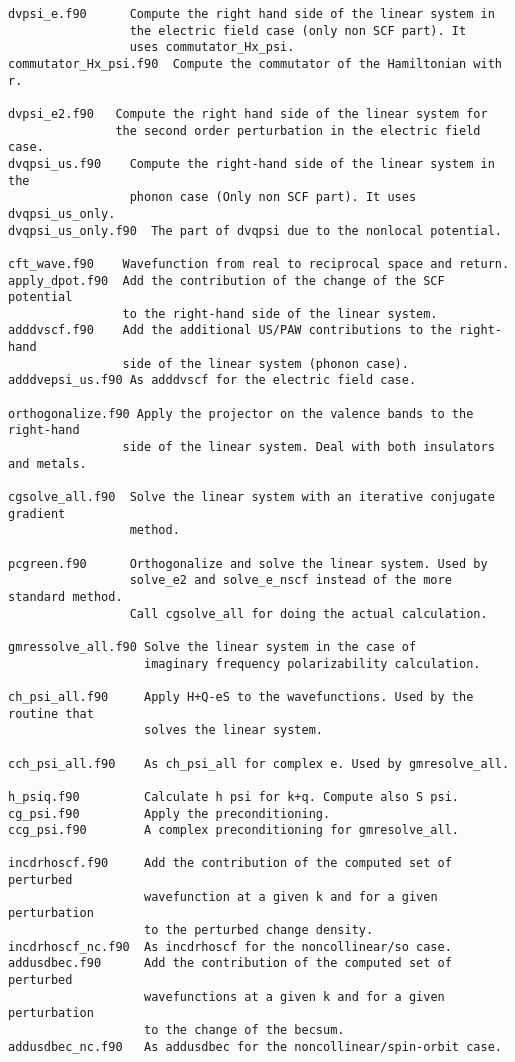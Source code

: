 \documentclass[12pt,a4paper]{article}
\begin{document}
\begin{verbatim}
dvpsi_e.f90      Compute the right hand side of the linear system in
                 the electric field case (only non SCF part). It
                 uses commutator_Hx_psi.
commutator_Hx_psi.f90  Compute the commutator of the Hamiltonian with r.       

dvpsi_e2.f90   Compute the right hand side of the linear system for
               the second order perturbation in the electric field case.                   
dvqpsi_us.f90    Compute the right-hand side of the linear system in the
                 phonon case (Only non SCF part). It uses dvqpsi_us_only.
dvqpsi_us_only.f90  The part of dvqpsi due to the nonlocal potential.          

cft_wave.f90    Wavefunction from real to reciprocal space and return.
apply_dpot.f90  Add the contribution of the change of the SCF potential  
                to the right-hand side of the linear system.               
adddvscf.f90    Add the additional US/PAW contributions to the right-hand
                side of the linear system (phonon case).
adddvepsi_us.f90 As adddvscf for the electric field case.

orthogonalize.f90 Apply the projector on the valence bands to the right-hand
                side of the linear system. Deal with both insulators and metals.

cgsolve_all.f90  Solve the linear system with an iterative conjugate gradient
                 method.                

pcgreen.f90      Orthogonalize and solve the linear system. Used by 
                 solve_e2 and solve_e_nscf instead of the more standard method.
                 Call cgsolve_all for doing the actual calculation.

gmressolve_all.f90 Solve the linear system in the case of 
                   imaginary frequency polarizability calculation.           

ch_psi_all.f90     Apply H+Q-eS to the wavefunctions. Used by the routine that 
                   solves the linear system.

cch_psi_all.f90    As ch_psi_all for complex e. Used by gmresolve_all.

h_psiq.f90         Calculate h psi for k+q. Compute also S psi.              
cg_psi.f90         Apply the preconditioning.               
ccg_psi.f90        A complex preconditioning for gmresolve_all.

incdrhoscf.f90     Add the contribution of the computed set of perturbed
                   wavefunction at a given k and for a given perturbation
                   to the perturbed change density.              
incdrhoscf_nc.f90  As incdrhoscf for the noncollinear/so case.         
addusdbec.f90      Add the contribution of the computed set of perturbed
                   wavefunctions at a given k and for a given perturbation
                   to the change of the becsum.               
addusdbec_nc.f90   As addusdbec for the noncollinear/spin-orbit case.


\end{verbatim}
\end{document}
